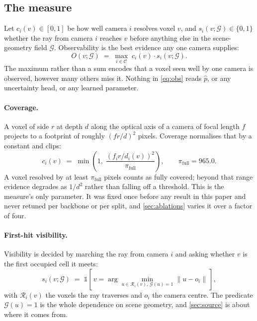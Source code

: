 \documentclass[10pt,twocolumn,letterpaper]{article}
\begin{document}
\subsection{The measure}
\label{sec:defn}
Let $c_i(v)\in[0,1]$ be how well camera $i$ resolves voxel $v$, and
$s_i(v;\mathcal{G})\in\{0,1\}$ whether the ray from camera $i$ reaches $v$
before anything else in the scene-geometry field $\mathcal{G}$.
Observability is the best evidence any one camera supplies:
\begin{equation}
O(v;\mathcal{G}) \;=\; \max_{i \in \mathcal{C}} \; c_i(v)\cdot
   s_i(v;\mathcal{G}).
\label{eq:obs}
\end{equation}
The maximum rather than a sum encodes that a voxel seen well by one camera
is observed, however many others miss it. Nothing in \cref{eq:obs} reads
$\hat{p}$, or any uncertainty head, or any learned parameter.

\paragraph{Coverage.}
A voxel of side $r$ at depth $d$ along the optical axis of a camera of
focal length $f$ projects to a footprint of roughly $(f r / d)^2$ pixels.
Coverage normalises that by a constant and clips:
\begin{equation}
c_i(v) \;=\; \min\!\left(1,\; \frac{(f_i r / d_i(v))^{2}}{\pi_{\text{full}}}\right),
\qquad \pi_{\text{full}} = 965.0 .
\label{eq:coverage}
\end{equation}
A voxel resolved by at least $\pi_{\text{full}}$ pixels counts as fully
covered; beyond that range evidence degrades as $1/d^2$ rather than
falling off a threshold. This is the measure's only parameter. It was
fixed once before any result in this paper and never retuned per backbone
or per split, and \cref{sec:ablations} varies it over a factor of four.

\paragraph{First-hit visibility.}
Visibility is decided by marching the ray from camera $i$ and asking
whether $v$ is the first occupied cell it meets:
\begin{equation}
s_i(v;\mathcal{G}) \;=\; \mathbb{1}\!\left[\,v = \!\!\arg\min_{u \in \mathcal{R}_i(v),\,
   \mathcal{G}(u)=1} \!\! \lVert u - o_i \rVert \,\right],
\label{eq:firsthit}
\end{equation}
with $\mathcal{R}_i(v)$ the voxels the ray traverses and $o_i$ the camera
centre. The predicate $\mathcal{G}(u)=1$ is the whole dependence on scene
geometry, and \cref{sec:source} is about where it comes from.
\end{document}
